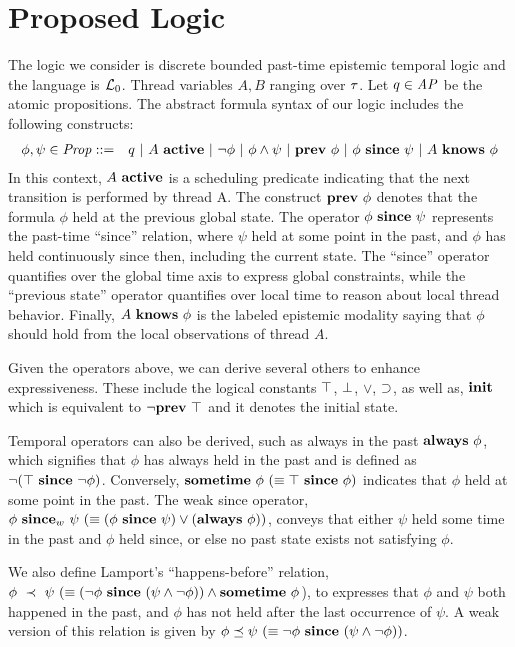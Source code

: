 \section{Proposed Logic}
%
The logic we consider is discrete bounded past-time epistemic temporal logic and the language is $\mathcal{L}_0$. 
Thread variables $A,B$ ranging over $\tau$. 
%
Let $q\in\mathit{AP}$ be the atomic propositions. The abstract formula syntax of our logic includes the following constructs: 
\begin{eqnarray*}
\phi,\psi\in\Prop & ::= &  q\ |\ A\ \Active\ |\ \neg\phi\ |\ \phi\wedge\psi\ |\ \Prev\ \phi\ |\ \phi\ \Since\ \psi\ |\ A\ \Knows\ \phi
\end{eqnarray*}
%
In this context, $A\ \Active$ is a scheduling predicate indicating that the next transition is performed by thread A.
%
The construct $\mathbf{prev}\ \phi$ denotes that the formula $\phi$ held at the previous global state.
%
The operator $\phi\ \mathbf{since}\ \psi$ represents the past-time ``since'' relation, where $\psi$ held at some point in the past, and $\phi$ has held continuously since then, including the current state. The ``since'' operator quantifies over the global time axis to express global constraints, while the ``previous state'' operator quantifies over local time to reason about local thread behavior.
%
Finally, $A\ \mathbf{knows}\ \phi$ is the labeled epistemic modality saying that $\phi$ should hold from the local observations of thread $A$.
%


Given the operators above, we can derive several others to enhance expressiveness. These include the logical constants $\top$, $\bot$, $\vee$, $\supset$, as well as, $\mathbf{init}$ which is equivalent to $\neg \mathbf{prev}\ \top$ and it denotes the initial state. 

Temporal operators can also be derived, such as always in the past $\mathbf{always}\ \phi$, which signifies that $\phi$ has always held in the past and is defined as $\neg(\top\ \mathbf{since}\ \neg\phi)$. Conversely, $\Sometime\ \phi\ (\equiv \True\ \Since\ \phi)$ indicates that $\phi$ held at some point in the past. The weak since operator, $\phi\ \mathbf{since}_w\ \psi\ (\equiv (\phi\ \mathbf{since}\ \psi) \vee (\mathbf{always}\ \phi))$, conveys that either $\psi$ held some time in the past and $\phi$ held since, or else no past state exists not satisfying $\phi$.

We also define Lamport's ``happens-before'' relation, $\phi\ \HappensBefore\ \psi\ (\equiv (\neg\phi\ \Since\ (\psi \wedge \neg\phi)) \wedge \Sometime\ \phi$), to expresses that $\phi$ and $\psi$ both happened in the past, and $\phi$ has not held after the last occurrence of $\psi$. A weak version of this relation is given by $\phi\WeakHappensBefore \psi\ (\equiv \neg\phi\ \Since\ (\psi \wedge \neg\phi))$.

